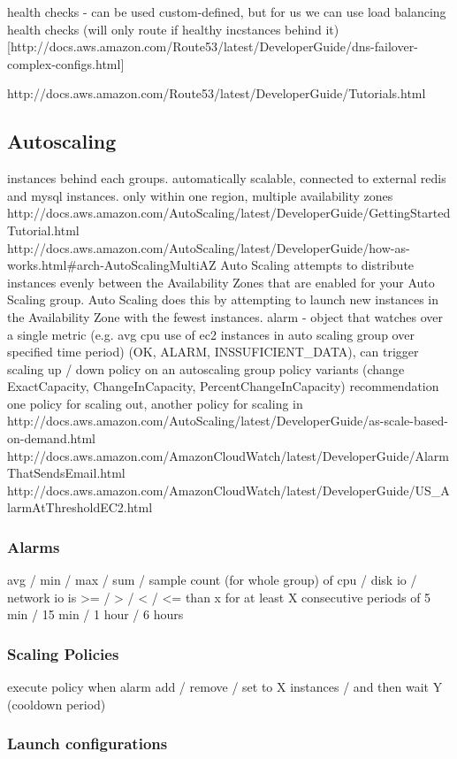 \documentclass{uvamscse}
\begin{document}
  health checks - can be used custom-defined, but for us we can use load balancing health checks (will only route if healthy incstances behind it) [http://docs.aws.amazon.com/Route53/latest/DeveloperGuide/dns-failover-complex-configs.html]

  http://docs.aws.amazon.com/Route53/latest/DeveloperGuide/Tutorials.html
\subsection{Autoscaling}
  instances behind each groups. automatically scalable, connected to external redis and mysql instances.
  only within one region, multiple availability zones
  http://docs.aws.amazon.com/AutoScaling/latest/DeveloperGuide/GettingStartedTutorial.html
  http://docs.aws.amazon.com/AutoScaling/latest/DeveloperGuide/how-as-works.html\#arch-AutoScalingMultiAZ
  Auto Scaling attempts to distribute instances evenly between the Availability Zones that are enabled for your Auto Scaling group. Auto Scaling does this by attempting to launch new instances in the Availability Zone with the fewest instances.
  alarm - object that watches over a single metric (e.g. avg cpu use of ec2 instances in auto scaling group over specified time period) (OK, ALARM, INSSUFICIENT\_DATA), can trigger scaling up / down policy on an autoscaling group
  policy variants (change ExactCapacity, ChangeInCapacity, PercentChangeInCapacity)
  recommendation one policy for scaling out, another policy for scaling in
  http://docs.aws.amazon.com/AutoScaling/latest/DeveloperGuide/as-scale-based-on-demand.html
  http://docs.aws.amazon.com/AmazonCloudWatch/latest/DeveloperGuide/AlarmThatSendsEmail.html
  http://docs.aws.amazon.com/AmazonCloudWatch/latest/DeveloperGuide/US\_AlarmAtThresholdEC2.html
  \subsubsection{Alarms}
  avg / min / max / sum / sample count (for whole group)
  of cpu / disk io / network io
  is >= / > / < / <= than x %
  for at least X consecutive periods of 5 min / 15 min / 1 hour / 6 hours
  \subsubsection{Scaling Policies}
  execute policy when alarm
  add / remove / set to   X   instances / %
  and then wait Y (cooldown period)

  \subsubsection{Launch configurations}
\end{document}
